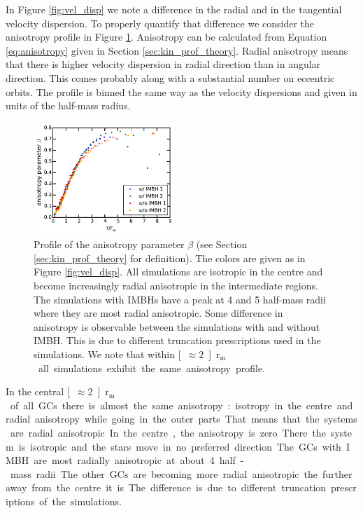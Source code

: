 \par In Figure \ref{fig:vel_disp} we note a difference in the radial and in the tangential velocity dispersion. To properly quantify that difference we consider the anisotropy profile in Figure \ref{fig:anisotropy_param}. Anisotropy can be calculated from Equation \eqref{eq:anisotropy} given in Section \ref{sec:kin_prof_theory}.  Radial anisotropy means that there is higher velocity dispersion in radial direction than in angular direction. This comes probably along with a substantial number on eccentric orbits. The profile is binned the same way as the velocity dispersions and given in units of the half-mass radius.
\begin{figure}[htbp]
	\centering
	\includegraphics[width=0.475\textwidth]{Plots/anisotropy_parameter_beta.pdf}
	\caption{Profile of the anisotropy parameter \(\beta\) (see Section \ref{sec:kin_prof_theory} for definition). The colors are given as in Figure \ref{fig:vel_disp}. All simulations are isotropic in the centre and become increasingly radial anisotropic in the intermediate regions. The simulations with \acp{IMBH} have a peak at 4 and 5 half-mass radii where they are most radial anisotropic. Some difference in anisotropy is observable between the simulations with and without \ac{IMBH}. This is due to different truncation prescriptions used in the simulations. We note that within \unit[\(\approx 2\)]{\(\mathrm{r_m}\)} all simulations exhibit the same anisotropy profile.}
	\label{fig:anisotropy_param}
\end{figure}
In the central \unit[\(\approx 2\)]{\(\mathrm{r_m}\)} of all \acp{GC} there is almost the same anisotropy: isotropy in the centre and radial anisotropy while going in the outer parts. That means that the systems are radial anisotropic. In the centre, the anisotropy is zero. There the system is isotropic and the stars move in no preferred direction. The \acp{GC} with \ac{IMBH} are most radially anisotropic at about 4 half-mass radii. The other \acp{GC} are becoming more radial anisotropic the further away from the centre it is. The difference is due to different truncation prescriptions of the simulations.

